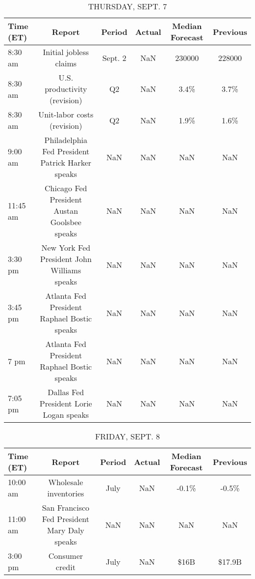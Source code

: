 \documentclass{article}%
\begin{document}
%


\begin{table}[htbp]%
\caption{THURSDAY, SEPT. 7}%
\centering%
\begin{adjustbox}{width=1\textwidth}%
\begin{tabular}{lccccc}
\toprule
Time (ET) &                                           Report &  Period & Actual & Median Forecast & Previous \\
\midrule
  8:30 am &                           Initial jobless claims & Sept. 2 &    NaN &          230000 &   228000 \\
  8:30 am &                     U.S. productivity (revision) &      Q2 &    NaN &            3.4\% &     3.7\% \\
  8:30 am &                      Unit-labor costs (revision) &      Q2 &    NaN &            1.9\% &     1.6\% \\
  9:00 am & Philadelphia Fed President Patrick Harker speaks &     NaN &    NaN &             NaN &      NaN \\
 11:45 am &     Chicago Fed President Austan Goolsbee speaks &     NaN &    NaN &             NaN &      NaN \\
  3:30 pm &      New York Fed President John Williams speaks &     NaN &    NaN &             NaN &      NaN \\
  3:45 pm &      Atlanta Fed President Raphael Bostic speaks &     NaN &    NaN &             NaN &      NaN \\
     7 pm &      Atlanta Fed President Raphael Bostic speaks &     NaN &    NaN &             NaN &      NaN \\
  7:05 pm &          Dallas Fed President Lorie Logan speaks &     NaN &    NaN &             NaN &      NaN \\
\bottomrule
\end{tabular}
%
\end{adjustbox}%
\end{table}

%


\begin{table}[htbp]%
\caption{FRIDAY, SEPT. 8}%
\centering%
\begin{adjustbox}{width=1\textwidth}%
\begin{tabular}{lccccc}
\toprule
Time (ET) &                                       Report & Period & Actual & Median Forecast & Previous \\
\midrule
 10:00 am &                        Wholesale inventories &   July &    NaN &           -0.1\% &    -0.5\% \\
 11:00 am & San Francisco Fed President Mary Daly speaks &    NaN &    NaN &             NaN &      NaN \\
  3:00 pm &                              Consumer credit &   July &    NaN &            \$16B &   \$17.9B \\
\bottomrule
\end{tabular}
%
\end{adjustbox}%
\end{table}
\end{document}
